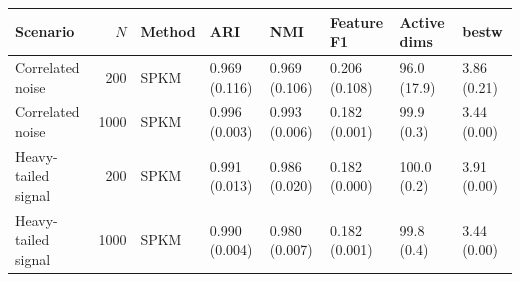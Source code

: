 \begin{tabular}{lrllllll}
\toprule
Scenario & $N$ & Method & ARI & NMI & Feature F1 & Active dims & bestw \\
\midrule
Correlated noise & 200 & SPKM & 0.969 (0.116) & 0.969 (0.106) & 0.206 (0.108) & 96.0 (17.9) & 3.86 (0.21) \\
Correlated noise & 1000 & SPKM & 0.996 (0.003) & 0.993 (0.006) & 0.182 (0.001) & 99.9 (0.3) & 3.44 (0.00) \\
Heavy-tailed signal & 200 & SPKM & 0.991 (0.013) & 0.986 (0.020) & 0.182 (0.000) & 100.0 (0.2) & 3.91 (0.00) \\
Heavy-tailed signal & 1000 & SPKM & 0.990 (0.004) & 0.980 (0.007) & 0.182 (0.001) & 99.8 (0.4) & 3.44 (0.00) \\
\bottomrule
\end{tabular}
